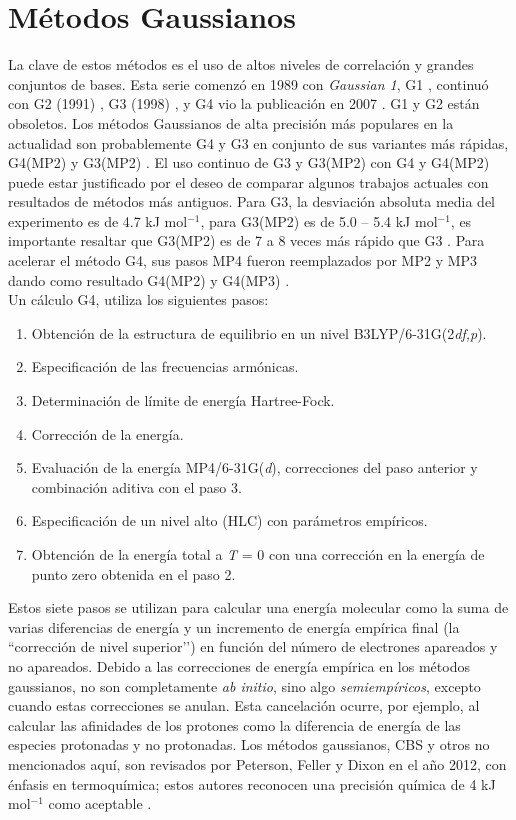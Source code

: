 \section{Métodos Gaussianos}

La clave de estos métodos es el uso de altos niveles de correlación y grandes conjuntos de bases. Esta serie comenzó en 1989 con \textit{Gaussian 1}, G1 \cite{Pople1989}, continuó con G2 (1991) \cite{Curtiss1991}, G3 (1998) \cite{Curtiss1998}, y G4 vio la publicación en 2007 \cite{Curtiss2007}. G1 y G2 están obsoletos. Los métodos Gaussianos de alta precisión más populares en la actualidad son probablemente G4 y G3 en conjunto de sus variantes más rápidas, G4(MP2) \cite{Curtiss2007a} y G3(MP2) \cite{Curtiss1999}. El uso continuo de G3 y G3(MP2) con G4 y G4(MP2) puede estar justificado por el deseo de comparar algunos trabajos actuales con resultados de métodos más antiguos. Para G3, la desviación absoluta media del experimento es de 4.7 kJ mol$^{-1}$, para G3(MP2)  es de 5.0 – 5.4 kJ mol$^{-1}$, es importante resaltar que G3(MP2) es de 7 a 8 veces más rápido que G3 \cite{Curtiss1998}. Para acelerar el método G4, sus pasos MP4 fueron reemplazados por MP2 y MP3 dando como resultado G4(MP2) y G4(MP3) \cite{Curtiss2007a, Lewars2016}. \\ Un cálculo G4, utiliza los siguientes pasos:
 
\begin{enumerate}
\item Obtención de la estructura de equilibrio en un nivel B3LYP/6-31G(2\textit{df,p}).
\item Especificación de las frecuencias armónicas.
\item Determinación de límite de energía Hartree-Fock.
\item Corrección de la energía.
\item Evaluación de la energía MP4/6-31G(\textit{d}), correcciones del paso anterior y combinación aditiva con el paso 3. 
\item Especificación de un nivel alto (HLC) con parámetros empíricos.
\item Obtención de la energía total a \textit{T} = 0 con una corrección en la energía de punto zero obtenida en el paso 2. 
\end{enumerate}

Estos siete pasos se utilizan para calcular una energía molecular como la suma de varias diferencias de energía y un incremento de energía empírica final (la ``corrección de nivel superior’’) en función del número de electrones apareados y no apareados. Debido a las correcciones de energía empírica en los métodos  gaussianos, no son completamente \textit{ab initio}, sino algo \textit{semiempíricos}, excepto cuando estas correcciones se anulan. Esta cancelación ocurre, por ejemplo, al calcular las afinidades de los protones como la diferencia de energía de las especies protonadas y no protonadas. Los métodos gaussianos, CBS y otros no mencionados aquí, son revisados  por Peterson, Feller y Dixon en el año 2012, con énfasis en termoquímica; estos autores reconocen una precisión química de 4 kJ mol$^{-1}$ como aceptable \cite{Peterson2012}. \\

